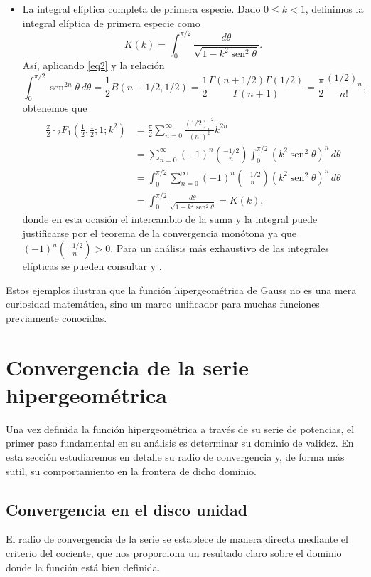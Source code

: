 \documentclass[12pt,a4paper]{book}
\renewcommand{\sin}{\operatorname{sen}}
\begin{document}
\begin{itemize}
    \item La integral elíptica completa de primera especie. Dado $0 \leq k <1$, definimos la integral elíptica de primera especie como
    \[K(k)= \int_{0}^{\pi/2} \frac{d\theta}{\sqrt{1-k^2 \sin^{2}{\theta}}}.\]
    Así, aplicando \eqref{eq2} y la relación
    \[\int_{0}^{\pi/2} \sin^{2n}\theta \, d\theta = \frac{1}{2} B(n+1/2, 1/2) = \frac{1}{2}\frac{\Gamma(n+ 1/2)\Gamma(1/2)}{\Gamma(n+1)} = \frac{\pi}{2}\frac{(1/2)_n}{n!},\]
    obtenemos que
    \begin{align*}
    \frac{\pi}{2} \cdot {}_{2}F_{1}\left(\frac{1}{2}, \frac{1}{2}; 1; k^2\right) &= \frac{\pi}{2} \sum_{n=0}^{\infty} \frac{{(1/2)_n}^2}{(n!)^2}k^{2n} \\ &=  \sum_{n=0}^{\infty} (-1)^n \binom{-1/2}{n}\int_{0}^{\pi/2} (k^2 \sin^2\theta)^n \,d\theta \\ &= \int_{0}^{\pi/2}\sum_{n=0}^{\infty} (-1)^n \binom{-1/2}{n}(k^2 \sin^2\theta)^n \, d\theta \\ &= \int_{0}^{\pi/2} \frac{d\theta}{\sqrt{1-k^2 \sin^{2}{\theta}}} = K(k),
    \end{align*}
    donde en esta ocasión el intercambio de la suma y la integral puede justificarse por el teorema de la convergencia monótona ya que $(-1)^n \binom{-1/2}{n} > 0$. Para un análisis más exhaustivo de las integrales elípticas se pueden consultar \cite{ortega} y \cite{puron}.
    
\end{itemize}
Estos ejemplos ilustran que la función hipergeométrica de Gauss no es una mera curiosidad matemática, sino un marco unificador para muchas funciones previamente conocidas.

\section{Convergencia de la serie hipergeométrica}
\label{sec:convergencia}

Una vez definida la función hipergeométrica a través de su serie de potencias, el primer paso fundamental en su análisis es determinar su dominio de validez. En esta sección estudiaremos en detalle su radio de convergencia y, de forma más sutil, su comportamiento en la frontera de dicho dominio.

\subsection{Convergencia en el disco unidad}

El radio de convergencia de la serie se establece de manera directa mediante el criterio del cociente, que nos proporciona un resultado claro sobre el dominio donde la función está bien definida.
\end{document}

